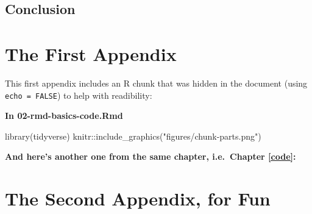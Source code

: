 \documentclass[a4paper, twoside]{templates/ociamthesis}
\newenvironment{Shaded}{\begin{snugshade}}{\end{snugshade}}
\newcommand{\FunctionTok}[1]{\textcolor[rgb]{0.00,0.00,0.00}{#1}}
\newcommand{\NormalTok}[1]{#1}
\newcommand{\SpecialCharTok}[1]{\textcolor[rgb]{0.00,0.00,0.00}{#1}}
\newcommand{\StringTok}[1]{\textcolor[rgb]{0.31,0.60,0.02}{#1}}
\renewenvironment{Shaded}
{
  \vspace{4pt}%
  \begin{snugshade}%
}{%
  \end{snugshade}%
  \vspace{4pt}%
}
\newcommand*{\bibtitle}{Works Cited}
\begin{document}
\hypertarget{conclusion-3}{%
\section*{Conclusion}\label{conclusion-3}}

\startappendices

\hypertarget{the-first-appendix}{%
\chapter{The First Appendix}\label{the-first-appendix}}

This first appendix includes an R chunk that was hidden in the document (using \texttt{echo\ =\ FALSE}) to help with readibility:

\textbf{In 02-rmd-basics-code.Rmd}

\begin{Shaded}
\begin{Highlighting}[]
\FunctionTok{library}\NormalTok{(tidyverse)}
\NormalTok{knitr}\SpecialCharTok{::}\FunctionTok{include\_graphics}\NormalTok{(}\StringTok{"figures/chunk{-}parts.png"}\NormalTok{)}
\end{Highlighting}
\end{Shaded}

\textbf{And here's another one from the same chapter, i.e.~Chapter \ref{code}:}

\hypertarget{the-second-appendix-for-fun}{%
\chapter{The Second Appendix, for Fun}\label{the-second-appendix-for-fun}}




\setlength{\baselineskip}{0pt} %

{\renewcommand*\MakeUppercase[1]{#1}%
\printbibliography[heading=bibintoc,title={\bibtitle}]}
\end{document}
